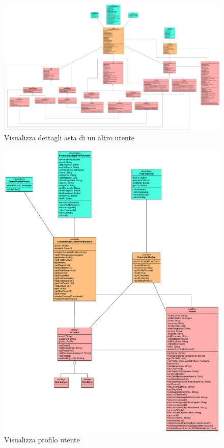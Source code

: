         \begin{figure}[htbp!]
            \centering
                \includegraphics[width=1\linewidth]{Immagini/Diagrammi/Class Diagram/Analisi/Utente generico/VisualizzaDettagliAstaUtente.pdf}
            \caption{Visualizza dettagli asta di un altro utente}
        \end{figure}
        
        \begin{figure}[htbp!]
            \centering
                \includegraphics[width=1\linewidth]{Immagini/Diagrammi/Class Diagram/Analisi/Utente generico/VisualizzaProfiloUtente.pdf}
            \caption{Visualizza profilo utente}
        \end{figure}
        
